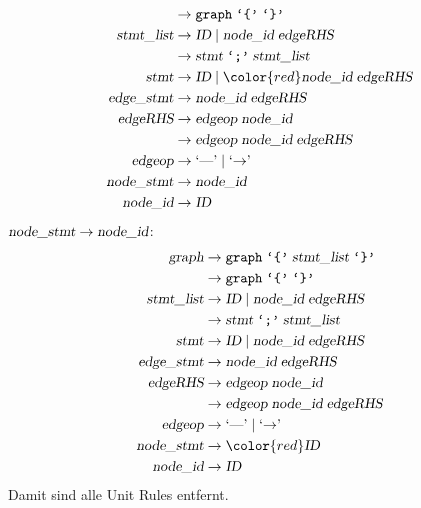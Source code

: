 \begin{loesung}
\begin{teilaufgaben}
\begin{align*}
                   &\rightarrow \texttt{graph}\; \texttt{`\{'}\; \texttt{`\}'} \\
\textsl{stmt\_list}&\rightarrow \textsl{ID}\; |\;
                                \textsl{node\_id}\; \textsl{edgeRHS} \\
                   &\rightarrow \textsl{stmt}\; \texttt{`;'}\; \textsl{stmt\_list}\\
\textsl{stmt}      &\rightarrow \textsl{ID}\; |\;
                                {\color{red}\textsl{node\_id}\; \textsl{edgeRHS}} \\
\textsl{edge\_stmt}&\rightarrow \textsl{node\_id}\; \textsl{edgeRHS} \\
\textsl{edgeRHS}   &\rightarrow \textsl{edgeop}\; \textsl{node\_id}\\
                   &\rightarrow \textsl{edgeop}\; \textsl{node\_id}\; \textsl{edgeRHS}\\
\textsl{edgeop}    &\rightarrow \textrm{`\text{---}'}\; |\; \textrm{`$\rightarrow$'}\; \\
\textsl{node\_stmt}&\rightarrow \textsl{node\_id} \\
\textsl{node\_id}  &\rightarrow \textsl{ID}
\end{align*}
$\textsl{node\_stmt}\to\textsl{node\_id}$:
\begin{align*}
\textsl{graph}     &\rightarrow \texttt{graph}\; \texttt{`\{'}\; \textsl{stmt\_list}\; \texttt{`\}'} \\
                   &\rightarrow \texttt{graph}\; \texttt{`\{'}\; \texttt{`\}'} \\
\textsl{stmt\_list}&\rightarrow \textsl{ID}\; |\;
                                \textsl{node\_id}\; \textsl{edgeRHS} \\
                   &\rightarrow \textsl{stmt}\; \texttt{`;'}\; \textsl{stmt\_list}\\
\textsl{stmt}      &\rightarrow \textsl{ID}\; |\;
                                \textsl{node\_id}\; \textsl{edgeRHS} \\
\textsl{edge\_stmt}&\rightarrow \textsl{node\_id}\; \textsl{edgeRHS} \\
\textsl{edgeRHS}   &\rightarrow \textsl{edgeop}\; \textsl{node\_id}\\
                   &\rightarrow \textsl{edgeop}\; \textsl{node\_id}\; \textsl{edgeRHS}\\
\textsl{edgeop}    &\rightarrow \textrm{`\text{---}'}\; |\; \textrm{`$\rightarrow$'}\; \\
\textsl{node\_stmt}&\rightarrow {\color{red}\textsl{ID}} \\
\textsl{node\_id}  &\rightarrow \textsl{ID}
\end{align*}
Damit sind alle Unit Rules entfernt. 


\end{teilaufgaben}
\end{loesung}
